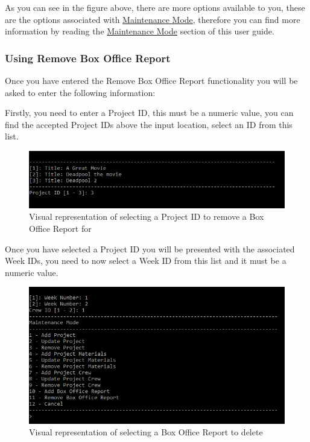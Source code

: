 \documentclass[
  english,
  a4paper,
,tablecaptionabove
]{scrartcl}
\begin{document}
As you can see in the figure above, there are more options available to
you, these are the options associated with
\protect\hyperlink{using-maintenance-mode}{Maintenance Mode}, therefore
you can find more information by reading the
\protect\hyperlink{using-maintenance-mode}{Maintenance Mode} section of
this user guide.

\newpage

\hypertarget{using-remove-box-office-report}{%
\subsubsection{Using Remove Box Office
Report}\label{using-remove-box-office-report}}

Once you have entered the Remove Box Office Report functionality you
will be asked to enter the following information:

Firstly, you need to enter a Project ID, this must be a numeric value,
you can find the accepted Project IDs above the input location, select
an ID from this list.

\begin{figure}
\centering
\includegraphics{images/user-guide/maintenance-mode/remove-project-select-id.png}
\caption{Visual representation of selecting a Project ID to remove a Box
Office Report for}
\end{figure}

Once you have selected a Project ID you will be presented with the
associated Week IDs, you need to now select a Week ID from this list and
it must be a numeric value.

\begin{figure}
\centering
\includegraphics{images/user-guide/maintenance-mode/remove-box-office-select-id.png}
\caption{Visual representation of selecting a Box Office Report to
delete}
\end{figure}
\end{document}

